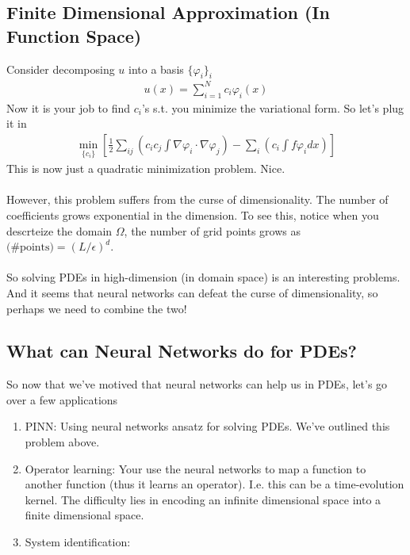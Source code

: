 \subsection{Finite Dimensional Approximation (In Function Space)}
Consider decomposing $u$ into a basis $\{\varphi_i\}_i$
\begin{align}
	u(x) = \sum_{i=1}^N c_i \varphi_i(x)
\end{align}
Now it is your job to find $c_i$'s s.t. you minimize the variational form. So let's plug it in
\begin{align}
	\min_{\{c_i\}} \left[\frac{1}{2} \sum_{ij} \left( c_i c_j \int \nabla \varphi_i \cdot \nabla \varphi_j  \right)- \sum_i \left( c_i \int f \varphi_i dx \right) \right]
\end{align}
This is now just a quadratic minimization problem. Nice.\\
\\
However, this problem suffers from the curse of dimensionality. The number of coefficients grows exponential in the dimension. To see this, notice when you descrteize the domain $\Omega$, the number of grid points grows as $\text{(\# points)} = (L/\epsilon)^d$.\\
\\
So solving PDEs in high-dimension (in domain space) is an interesting problems. And it seems that neural networks can defeat the curse of dimensionality, so perhaps we need to combine the two!

\subsection{What can Neural Networks do for PDEs?}
So now that we've motived that neural networks can help us in PDEs, let's go over a few applications
\begin{enumerate}
	\item PINN: Using neural networks ansatz for solving PDEs. We've outlined this problem above.
	\item Operator learning: Your use the neural networks to map a function to another function (thus it learns an operator). I.e. this can be a time-evolution kernel. The difficulty lies in encoding an infinite dimensional space into a finite dimensional space.
	\item System identification:
\end{enumerate}


